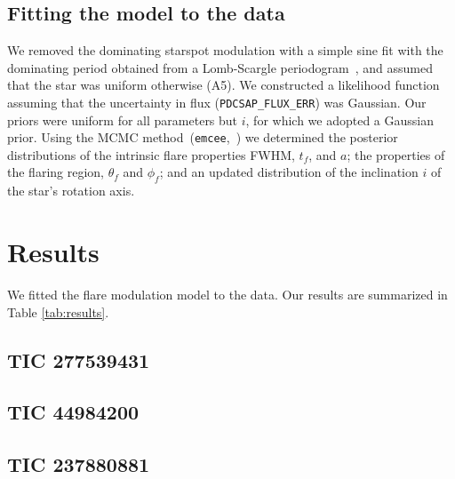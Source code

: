 \documentclass[fleqn,usenatbib,letters]{mnras}%
\newcommand{\FA}{TIC 277539431} %
\newcommand{\FB}{TIC 44984200} %
\newcommand{\FC}{TIC 237880881} %
\begin{document}
\subsection{Fitting the model to the data}
\label{ssec:fittingmodeltodata}
We removed the dominating starspot modulation with a simple sine fit with the dominating period obtained from a Lomb-Scargle periodogram~\citep{lomb1976, scargle1982}, and assumed that the star was uniform otherwise (A5).%
We constructed a likelihood function assuming that the uncertainty in flux (\texttt{PDCSAP\_FLUX\_ERR}) was Gaussian. Our priors were uniform for all parameters but $i$, for which we adopted a Gaussian prior. Using the MCMC method~(\texttt{emcee},~\citealt{foreman_mackey2013}) we determined the posterior distributions of the intrinsic flare properties FWHM, $t_f$, and $a$; the properties of the flaring region, $\theta_f$ and $\phi_f$; and an updated distribution of the inclination $i$ of the star's rotation axis.
\section{Results}
\label{sec:results}

We fitted the flare modulation model to the data. Our results are summarized in Table \ref{tab:results}.
\subsection{\FA}

\subsection{\FB}
\subsection{\FC}
\end{document}
